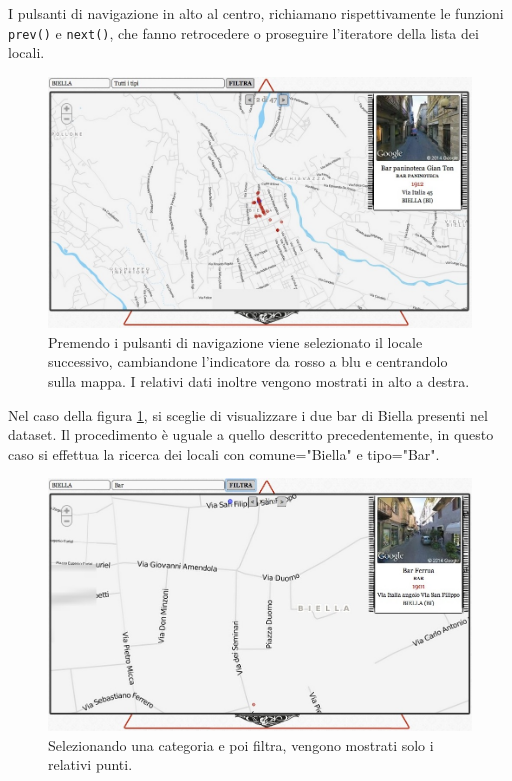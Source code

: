 I pulsanti di navigazione in alto al centro, richiamano rispettivamente le funzioni \texttt{prev()} e \texttt{next()}, che fanno retrocedere o proseguire l'iteratore della lista dei locali.

\begin{figure}[ht!]
	\caption{Premendo i pulsanti di navigazione viene selezionato il locale successivo, cambiandone l'indicatore da rosso a blu e centrandolo sulla mappa. I relativi dati inoltre vengono mostrati in alto a destra.}
	\centering
		\includegraphics[width=\textwidth]{img/s6.jpg}
\end{figure}

Nel caso della figura \ref{fig:biella}, si sceglie di visualizzare i due bar di Biella presenti nel dataset. Il procedimento è uguale a quello descritto precedentemente, in questo caso si effettua la ricerca dei locali con comune="Biella" e tipo="Bar".

\begin{figure}[ht!]
	\caption{Selezionando una categoria e poi filtra, vengono mostrati solo i relativi punti.}
	\label{fig:biella}
	\centering
		\includegraphics[width=\textwidth]{img/s8.jpg}
\end{figure}

